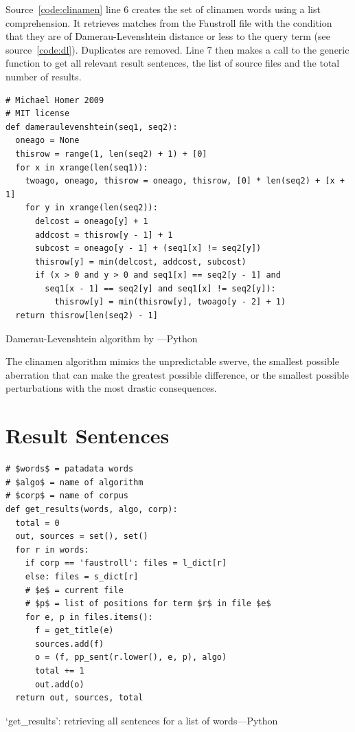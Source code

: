 Source~\ref{code:clinamen} line 6 creates the set of clinamen words using a list comprehension. It retrieves matches from the Faustroll file  with the condition that they are of Damerau-Levenshtein distance  or less to the query term  (see source~\ref{code:dl}). Duplicates are removed. Line 7 then makes a call to the generic  function to get all relevant result sentences, the list of source files and the total number of results.

\begin{listing}[!htbp] %
  \begin{verbatim}
# Michael Homer 2009
# MIT license
def dameraulevenshtein(seq1, seq2):
  oneago = None
  thisrow = range(1, len(seq2) + 1) + [0]
  for x in xrange(len(seq1)):
    twoago, oneago, thisrow = oneago, thisrow, [0] * len(seq2) + [x + 1]
    for y in xrange(len(seq2)):
      delcost = oneago[y] + 1
      addcost = thisrow[y - 1] + 1
      subcost = oneago[y - 1] + (seq1[x] != seq2[y])
      thisrow[y] = min(delcost, addcost, subcost)
      if (x > 0 and y > 0 and seq1[x] == seq2[y - 1] and
        seq1[x - 1] == seq2[y] and seq1[x] != seq2[y]):
          thisrow[y] = min(thisrow[y], twoago[y - 2] + 1)
  return thisrow[len(seq2) - 1]
  \end{verbatim}
\caption[`dameraulevenshtein' function---Python]{Damerau-Levenshtein algorithm by \autocite{Homer2009}---Python}
\label{code:dl}
\end{listing}

The clinamen algorithm mimics the unpredictable swerve, the smallest possible aberration that can make the greatest possible difference, or the smallest possible perturbations with the most drastic consequences. 


\section{Result Sentences}
\label{s:ressent}


\begin{listing}[!htbp] %
  \begin{verbatim}
# $words$ = patadata words
# $algo$ = name of algorithm
# $corp$ = name of corpus
def get_results(words, algo, corp):
  total = 0
  out, sources = set(), set()
  for r in words:
    if corp == 'faustroll': files = l_dict[r]
    else: files = s_dict[r]
    # $e$ = current file
    # $p$ = list of positions for term $r$ in file $e$
    for e, p in files.items():
      f = get_title(e)
      sources.add(f)
      o = (f, pp_sent(r.lower(), e, p), algo)
      total += 1
      out.add(o)
  return out, sources, total
  \end{verbatim}
\caption[`get\_results' function---Python]{`get\_results': retrieving all sentences for a list of words---Python}
\label{code:getresults}
\end{listing}

